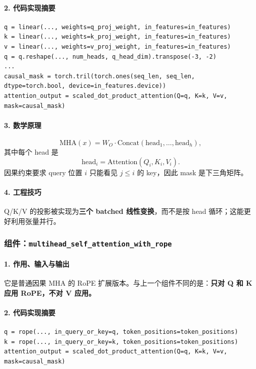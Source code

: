 \documentclass[UTF8,a4paper,11pt]{ctexart}
\begin{document}
\paragraph{2. 代码实现摘要}
\begin{lstlisting}
q = linear(..., weights=q_proj_weight, in_features=in_features)
k = linear(..., weights=k_proj_weight, in_features=in_features)
v = linear(..., weights=v_proj_weight, in_features=in_features)
q = q.reshape(..., num_heads, q_head_dim).transpose(-3, -2)
...
causal_mask = torch.tril(torch.ones(seq_len, seq_len, dtype=torch.bool, device=in_features.device))
attention_output = scaled_dot_product_attention(Q=q, K=k, V=v, mask=causal_mask)
\end{lstlisting}

\paragraph{3. 数学原理}
\[
\mathrm{MHA}(x)=W_O \cdot \mathrm{Concat}(\mathrm{head}_1,\dots,\mathrm{head}_h),
\]
其中每个 head 是
\[
\mathrm{head}_i = \mathrm{Attention}(Q_i, K_i, V_i).
\]
因果约束要求 query 位置 \(i\) 只能看见 \(j \le i\) 的 key，因此 mask 是下三角矩阵。

\paragraph{4. 工程技巧}
Q/K/V 的投影被实现为\textbf{三个 batched 线性变换}，而不是按 head 循环；这能更好利用张量并行。

\subsubsection{组件：\texttt{multihead\_self\_attention\_with\_rope}}
\paragraph{1. 作用、输入与输出}
它是普通因果 MHA 的 RoPE 扩展版本。与上一个组件不同的是：\textbf{只对 Q 和 K 应用 RoPE，不对 V 应用。}

\paragraph{2. 代码实现摘要}
\begin{lstlisting}
q = rope(..., in_query_or_key=q, token_positions=token_positions)
k = rope(..., in_query_or_key=k, token_positions=token_positions)
attention_output = scaled_dot_product_attention(Q=q, K=k, V=v, mask=causal_mask)
\end{lstlisting}
\end{document}

